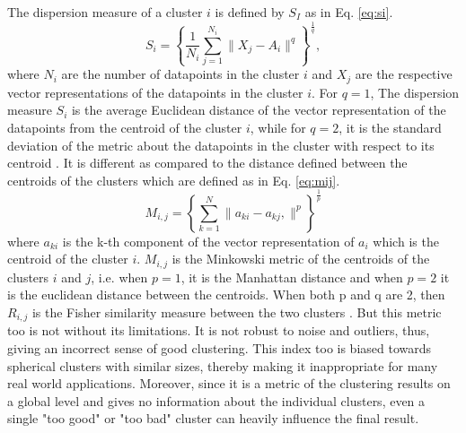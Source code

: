 The dispersion measure of a cluster $i$ is defined by $S_I$ as in Eq. \ref{eq:si}.
\begin{equation}
  \label{eq:si}
  \mathit{S_i}= \mathit{\left\{\frac{1}{N_i}\sum_{j=1}^{N_i} \lVert X_j - A_i \rVert^q\right\}^{\frac{1}{q}}}, 
\end{equation}
where $N_i$ are the number of datapoints in the cluster $i$ and $X_j$ are the respective vector representations of the datapoints in the cluster $i$. For $q=1$, The dispersion measure $S_i$ is the average Euclidean distance of the vector representation of the datapoints from the centroid of the cluster $i$, while for $q=2$, it is the standard deviation of the metric about the datapoints in the cluster with respect to its centroid \cite{vergani2018soft}. It is different as compared to the distance defined between the centroids of the clusters which are defined as in Eq. \ref{eq:mij}.
\begin{equation}
  \label{eq:mij}
  \mathit{M_{i,j}}= \mathit{\left\{\sum_{k=1}^{N} \lVert a_{ki} - a_{kj}, \rVert^p\right\}^{\frac{1}{p}}} 
\end{equation}
where $a_{ki}$ is the k-th component of the vector representation of $a_i$ which is the centroid of the cluster $i$. $M_{i,j}$ is the Minkowski metric of the centroids of the clusters $i$ and $j$, i.e. when $p=1$, it is the Manhattan distance and when $p=2$ it is the euclidean distance between the centroids. When both p and q are 2, then $R_{i,j}$ is the Fisher similarity measure between the two clusters \cite{vergani2018soft}. But this metric too is not without its limitations. It is not robust to noise and outliers, thus, giving an incorrect sense of good clustering. This index too is biased towards spherical clusters with similar sizes, thereby making it inappropriate for many real world applications. Moreover, since it is a metric of the clustering results on a global level and gives no information about the individual clusters, even a single "too good" or "too bad" cluster can heavily influence the final result.

